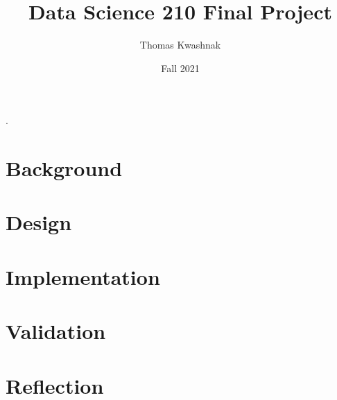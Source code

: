 \documentclass[10pt]{article}
\title{Data Science 210 Final Project}
\author{Thomas Kwashnak}
\date{Fall 2021}
\begin{document}
\maketitle
\setlength{\parindent}{0pt}.
\setlength{\parskip}{\baselineskip}
\lstset{numbers=left, numberstyle=\footnotesize, frame=l} 

\section{Background}
\section{Design}
\section{Implementation}
\section{Validation}
\section{Reflection}
\end{document}
